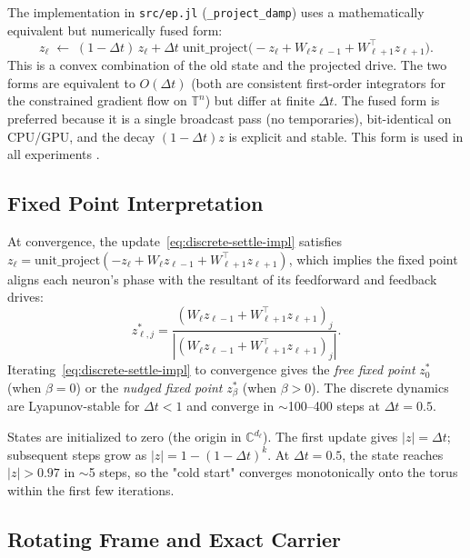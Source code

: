 \documentclass[11pt]{article}
\newcommand{\C}{\mathbb{C}}
\newcommand{\T}{\mathbb{T}}
\newcommand{\dt}{\Delta t}
\newcommand{\unitproject}{\mathrm{unit\_project}}
\begin{document}
The implementation in \texttt{src/ep.jl} (\texttt{\_project\_damp}) uses a mathematically equivalent but numerically fused form:
\begin{equation}\label{eq:discrete-settle-impl}
z_\ell \;\leftarrow\; (1-\dt)\,z_\ell + \dt \;\unitproject\Big( -z_\ell + W_\ell z_{\ell-1} + W_{\ell+1}^\top z_{\ell+1} \Big).
\end{equation}
This is a convex combination of the old state and the projected drive. The two forms are equivalent to $O(\dt)$ (both are consistent first-order integrators for the constrained gradient flow on $\T^n$) but differ at finite $\dt$. The fused form is preferred because it is a single broadcast pass (no temporaries), bit-identical on CPU/GPU, and the decay $(1-\dt)z$ is explicit and stable. This form is used in all experiments \citep{olin2021deep}.

\subsection{Fixed Point Interpretation}\label{ssec:fixed-point}

At convergence, the update~\eqref{eq:discrete-settle-impl} satisfies $z_\ell = \unitproject( -z_\ell + W_\ell z_{\ell-1} + W_{\ell+1}^\top z_{\ell+1} )$, which implies the fixed point aligns each neuron's phase with the resultant of its feedforward and feedback drives:
\begin{equation}
z_{\ell,j}^* = \frac{ (W_\ell z_{\ell-1} + W_{\ell+1}^\top z_{\ell+1})_j }{ |(W_\ell z_{\ell-1} + W_{\ell+1}^\top z_{\ell+1})_j| }.
\end{equation}
Iterating~\eqref{eq:discrete-settle-impl} to convergence gives the \emph{free fixed point} $z_0^*$ (when $\beta=0$) or the \emph{nudged fixed point} $z_\beta^*$ (when $\beta>0$). The discrete dynamics are Lyapunov-stable for $\dt < 1$ and converge in $\sim$100--400 steps at $\dt=0.5$.

\begin{remark}[Initialization]
States are initialized to zero (the origin in $\C^{d_\ell}$). The first update gives $|z| = \dt$; subsequent steps grow as $|z| = 1 - (1-\dt)^k$. At $\dt=0.5$, the state reaches $|z| > 0.97$ in $\sim$5 steps, so the "cold start" converges monotonically onto the torus within the first few iterations.
\end{remark}

\subsection{Rotating Frame and Exact Carrier}\label{ssec:rotating-frame}
\end{document}
